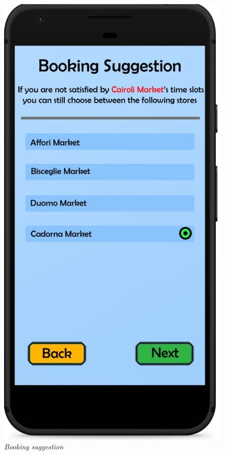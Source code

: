 \documentclass{article}
\begin{document}
\begin{figure}[!h]
\begin{minipage}[!h]{0.4\textwidth}
			\end{minipage}
			\hfill
			\begin{minipage}[!h]{0.4\textwidth}
				\includegraphics[width=\textwidth]{../Mockups/BookingSuggestion.png}
				\caption{\emph{Booking suggestion}}
			\end{minipage}
		\end{figure}
		
\end{document}
